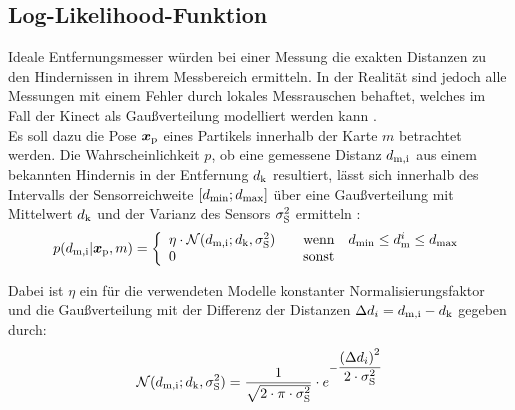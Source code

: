 \subsection{Log-Likelihood-Funktion}
\label{chap.loglik}
Ideale Entfernungsmesser würden bei einer Messung die exakten Distanzen zu den Hindernissen in ihrem Messbereich ermitteln. In der Realität sind jedoch alle Messungen mit einem Fehler durch lokales Messrauschen behaftet, welches im Fall der Kinect als Gaußverteilung modelliert werden kann \cite{Nguyen2012}.\\

Es soll dazu die Pose $\mbox{\boldmath{$x$}}_{{\mathrm{p}}}$ eines Partikels innerhalb der Karte $m$ betrachtet werden. Die Wahrscheinlichkeit $p$, ob eine gemessene Distanz $d_{{\mathrm{m,i}}}$ aus einem bekannten Hindernis in der Entfernung $d_{{\mathrm{k}}}$ resultiert, lässt sich innerhalb des Intervalls der Sensorreichweite $[d_{{\mathrm{min}}};d_{{\mathrm{max}}}]$ über eine Gaußverteilung mit Mittelwert $d_{{\mathrm{k}}}$ und der Varianz des Sensors $\sigma_{{\mathrm{S}}}^2$ ermitteln \cite{Thrun2005}:
%
\begin{equation}
p(d_{{\mathrm{m,i}}}|\mbox{\boldmath{$x$}}_{{\mathrm{p}}},m) = \left\lbrace\begin{array}{ll}
\eta  \cdot \mathcal{N}(d_{{\mathrm{m,i}}};d_{{\mathrm{k}}},\sigma_{{\mathrm{S}}}^2) & \quad \text{wenn} \quad d_{{\mathrm{min}}}\leq d_{{\mathrm{m}}}^i \leq d_{{\mathrm{max}}} \\
0 & \quad \text{sonst}
\end{array}
\right.
\end{equation}


Dabei ist $\eta$ ein für die verwendeten Modelle konstanter Normalisierungsfaktor und die Gaußverteilung mit der Differenz der Distanzen ${\Delta d}_i = d_{{\mathrm{m,i}}}-d_{{\mathrm{k}}}$  gegeben durch:
%
\begin{equation}
\mathcal{N}(d_{{\mathrm{m,i}}};d_{{\mathrm{k}}},\sigma_{{\mathrm{S}}}^2) = \frac{1}{\sqrt{2 \cdot \pi \cdot \sigma_{{\mathrm{S}}}^2}}  \cdot e^{-\dfrac{{({\Delta d}_i)}^2}{2 \cdot \sigma_{{\mathrm{S}}}^2}}
\end{equation}

